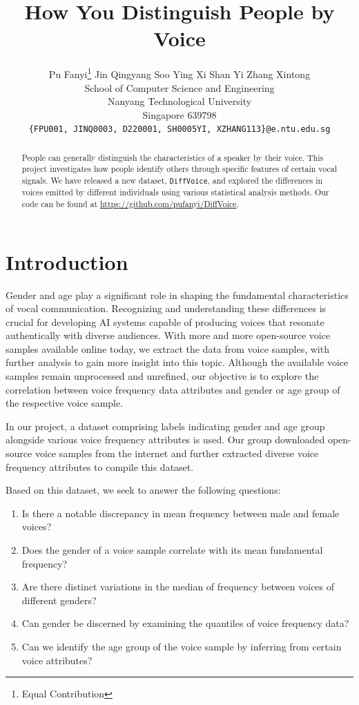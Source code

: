 \documentclass{article}
\title{How You Distinguish People by Voice}
\author{%
	Pu Fanyi\thanks{Equal Contribution} \hspace{1em} Jin Qingyang\footnotemark[1] \hspace{1em} Soo Ying Xi\footnotemark[1] \hspace{1em} Shan Yi\footnotemark[1] \hspace{1em} Zhang Xintong\footnotemark[1] \\
	School of Computer Science and Engineering\\
	Nanyang Technological University\\
	Singapore 639798 \\
	\texttt{\{FPU001, JINQ0003, D220001, SH0005YI, XZHANG113\}@e.ntu.edu.sg} \\
}
\begin{document}
	
	
	\newpage
	
	
	\maketitle
	
	
	\begin{abstract}
		People can generally distinguish the characteristics of a speaker by their voice. This project investigates how people identify others through specific features of certain vocal signals. We have released a new dataset, \texttt{DiffVoice}, and explored the differences in voices emitted by different individuals using various statistical analysis methods. Our code can be found at \url{https://github.com/pufanyi/DiffVoice}.
	\end{abstract}
	
	
	\section{Introduction}
	Gender and age play a significant role in shaping the fundamental characteristics of vocal communication. Recognizing and understanding these differences is crucial for developing AI systems capable of producing voices that resonate authentically with diverse audiences. With more and more open-source voice samples available online today, we extract the data from voice samples, with further analysis to gain more insight into this topic. Although the available voice samples remain unprocessed and unrefined, our objective is to explore the correlation between voice frequency data attributes and gender or age group of the respective voice sample.
	
	In our project, a dataset comprising labels indicating gender and age group alongside various voice frequency attributes is used. Our group downloaded open-source voice samples from the internet and further extracted diverse voice frequency attributes to compile this dataset.
	
	Based on this dataset, we seek to answer the following questions:
	\begin{enumerate}
		\item Is there a notable discrepancy in mean frequency between male and female voices?
		\item Does the gender of a voice sample correlate with its mean fundamental frequency?
		\item Are there distinct variations in the median of frequency between voices of different genders?
		\item Can gender be discerned by examining the quantiles of voice frequency data?
		\item Can we identify the age group of the voice sample by inferring from certain voice attributes?
	\end{enumerate}
	
\end{document}
